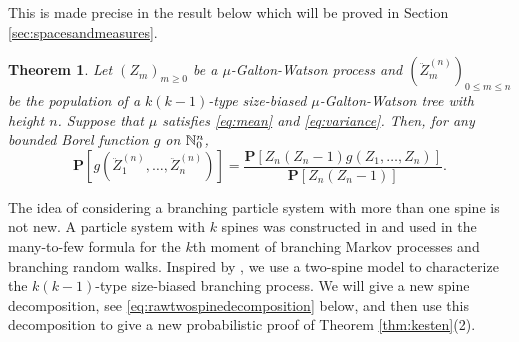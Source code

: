\documentclass[12pt]{amsart}
\newtheorem{thm}{Theorem}[section]
\numberwithin{equation}{section}
\newcommand{\prob}{\mathbf P}
\newcommand{\expr}[1]{\left( #1 \right)}
\newcommand{\brac}[1]{\left[ #1 \right]}
\begin{document}
	This is made precise in the result below which will be proved in Section \ref{sec:spacesandmeasures}.
\begin{thm}
\label{thm:changeofmeasure}
	Let $(Z_m)_{m\ge 0}$ be a $\mu$-Galton-Watson process and
		$(\ddot Z_m^{(n)})_{0\le m\le n}$
	be the population of a $k(k-1)$-type size-biased $\mu$-Galton-Watson tree with height $n$.
Suppose that $\mu$ satisfies \eqref{eq:mean} and \eqref{eq:variance}. 
Then, for any bounded Borel function $g$ on $\mathbb N^{n}_0$,
\begin{equation*}
				 \prob\brac{g\expr{\ddot Z_1^{(n)},\dots,\ddot Z_n^{(n)}}}
	=
				 \frac{\prob\brac{Z_n(Z_n-1) g\expr{Z_1,\dots, Z_n}}}{\prob\brac{Z_n(Z_n-1)}}.			%
\end{equation*}
	\end{thm}
\par
	The idea of considering a branching particle system with more than one spine is not new.
	A particle system with $k$ spines  was constructed in \cite{harris2015many} and used in the  many-to-few formula for the $k$th moment of branching Markov processes and branching random walks. Inspired by \cite{harris2015many}, we use a 
two-spine model to characterize the $k(k-1)$-type size-biased branching process.
We will give a new spine decomposition, see \eqref{eq:rawtwospinedecomposition} 
below, and then use this decomposition to give a new probabilistic proof of 
Theorem \ref{thm:kesten}(2).
\end{document}
